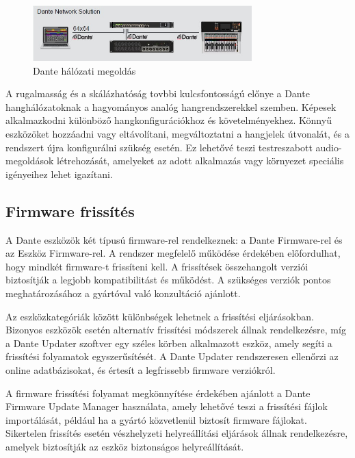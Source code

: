 \begin{figure}[H]
	\centering
	\includegraphics[width=320px, keepaspectratio]{figures/dante-solution.jpg}
	\caption{Dante hálózati megoldás}
	\label {fig:dante-solution}
\end{figure}
A rugalmasság és a skálázhatóság tovbbi kulcsfontosságú előnye a Dante
hanghálózatoknak a hagyományos analóg hangrendszerekkel szemben.
Képesek alkalmazkodni különböző hangkonfigurációkhoz és követelményekhez. 
Könnyű eszközöket hozzáadni vagy eltávolítani, megváltoztatni a hangjelek útvonalát, és a rendszert újra
konfigurálni szükség esetén. Ez lehetővé teszi testreszabott audio-megoldások
létrehozását, amelyeket az adott alkalmazás vagy környezet speciális igényeihez
lehet igazítani. 
\subsection{Firmware frissítés}
A Dante eszközök két típusú firmware-rel rendelkeznek: a Dante Firmware-rel és az 
Eszköz Firmware-rel. A rendszer megfelelő működése érdekében előfordulhat, hogy mindkét 
firmware-t frissíteni kell. A frissítések összehangolt verziói biztosítják a legjobb 
kompatibilitást és működést. A szükséges verziók pontos meghatározásához a gyártóval 
való konzultáció ajánlott.

Az eszközkategóriák között különbségek lehetnek a frissítési eljárásokban. Bizonyos 
eszközök esetén alternatív frissítési módszerek állnak rendelkezésre, míg a Dante 
Updater szoftver egy széles körben alkalmazott eszköz, amely segíti a frissítési 
folyamatok egyszerűsítését. A Dante Updater rendszeresen ellenőrzi az online 
adatbázisokat, és értesít a legfrissebb firmware verziókról.

A firmware frissítési folyamat megkönnyítése érdekében ajánlott a Dante Firmware 
Update Manager használata, amely lehetővé teszi a frissítési fájlok importálását, 
például ha a gyártó közvetlenül biztosít firmware fájlokat. Sikertelen frissítés 
esetén vészhelyzeti helyreállítási eljárások állnak rendelkezésre, amelyek biztosítják 
az eszköz biztonságos helyreállítását.

